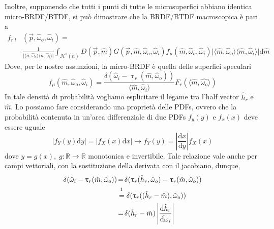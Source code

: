 Inoltre, supponendo che tutti i punti di tutte le microsuperfici abbiano identica micro-BRDF/BTDF, si pu\`o dimostrare che la BRDF/BTDF macroscopica
\`e pari a \cite{pegoraro}
\begin{align}\label{chapter3:surface:brdfIntegral}
	f_{r|t}&(\vec{p},\hat{\omega}_o,\hat{\omega}_i)=\\
		&\frac{1}{\vert\langle\hat{n},\hat{\omega}_o\rangle\langle\hat{n},\hat{\omega}_i\rangle\vert}%
		\int_{\mathcal{H}^2(\hat{n})}D(\vec{p},\hat{m})G(\vec{p},\hat{m},\hat{\omega}_o,\hat{\omega}_i)f_\mu(\hat{m},\hat{\omega}_o,\hat{\omega}_i)%
		\vert\langle\hat{m},\hat{\omega}_o\rangle\langle\hat{m},\hat{\omega}_i\rangle\vert\mathrm{d}\hat{m}
\end{align}
Dove, per le nostre assunzioni, la micro-BRDF \`e quella delle superfici speculari
\begin{equation}
	f_\mu(\hat{m},\hat{\omega}_o,\hat{\omega}_i)=\frac{\delta(\hat{\omega}_i-\uptau_r(\hat{m},\hat{\omega}_o))}{\langle\hat{m},\hat{\omega}_i\rangle}%
		F_r(\langle\hat{m},\hat{\omega_o}\rangle)
\end{equation}
In tale densit\`a di probabilit\`a vogliamo esplicitare il legame tra l'half vector $\hat{h}_r$ e $\hat{m}$. Lo possiamo fare considerando una 
propriet\`a delle PDFs, ovvero che la probabilit\`a contenuta in un'area differenziale di due PDFs $f_y(y)$ e $f_x(x)$ deve essere uguale
\begin{equation*}
	\vert f_Y(y)\mathrm{d}y\vert=\vert f_X(x)\mathrm{d}x\vert\longrightarrow f_Y(y)=\left\vert\frac{\mathrm{d}x}{\mathrm{d}y}\right\vert f_X(x)
\end{equation*}
dove $y=g(x),\;g:\mathbb{R}\rightarrow\mathbb{R}$ monotonica e invertibile. Tale relazione vale anche per campi vettoriali, con la sostituzione della
derivata con il jacobiano, dunque\footnotemark{},
\begin{align}\label{chapter3:surface:deltaJacobian}
	\delta(\hat{\omega}_i-\uptau_r(\hat{m},\hat{\omega}_o))%
		&\mathmakebox[\widthof{xx}]{=}\delta(\uptau_r(\hat{h}_r,\hat{\omega}_o)-\uptau_r(\hat{m},\hat{\omega}_o)) \nonumber \\
		&\stackrel{\footnotemark{}}{=}\delta(\uptau_r((\hat{h}_r-\hat{m}),\hat{\omega}_o)) \nonumber \\
		&\mathmakebox[\widthof{xx}]{=}\delta(\hat{h}_r-\hat{m})\left\vert\frac{\mathrm{d}\hat{h}_r}{\hat{\mathrm{d}\omega}_i}\right\vert
\end{align}
